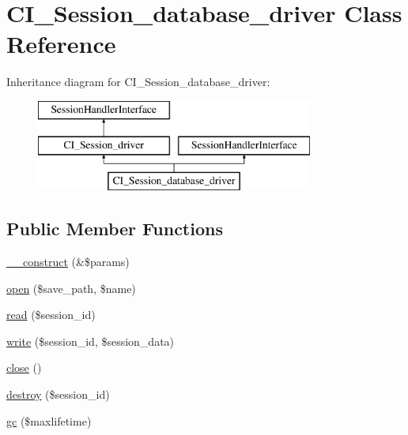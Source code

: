 \hypertarget{class_c_i___session__database__driver}{}\section{C\+I\+\_\+\+Session\+\_\+database\+\_\+driver Class Reference}
\label{class_c_i___session__database__driver}
Inheritance diagram for C\+I\+\_\+\+Session\+\_\+database\+\_\+driver\+:\begin{figure}[H]
\begin{center}
\leavevmode
\includegraphics[height=3.000000cm]{class_c_i___session__database__driver}
\end{center}
\end{figure}
\subsection*{Public Member Functions}
\begin{DoxyCompactItemize}
\item 
\mbox{\hyperlink{class_c_i___session__database__driver_ac1669c73d53d6f16cf5459a1e84d39c8}{\+\_\+\+\_\+construct}} (\&\$params)
\item 
\mbox{\hyperlink{class_c_i___session__database__driver_a614b5cf3840833913c7a73260ed28e02}{open}} (\$save\+\_\+path, \$name)
\item 
\mbox{\hyperlink{class_c_i___session__database__driver_a5bbf84ebf657be4eaccc0582377c76bf}{read}} (\$session\+\_\+id)
\item 
\mbox{\hyperlink{class_c_i___session__database__driver_ad9d124885be93668f1dbf6aace5964f5}{write}} (\$session\+\_\+id, \$session\+\_\+data)
\item 
\mbox{\hyperlink{class_c_i___session__database__driver_aa69c8bf1f1dcf4e72552efff1fe3e87e}{close}} ()
\item 
\mbox{\hyperlink{class_c_i___session__database__driver_aaec5812f6b4eb6835f88d3baa06a002a}{destroy}} (\$session\+\_\+id)
\item 
\mbox{\hyperlink{class_c_i___session__database__driver_a57aff7ee0656d8aa75d545fb8b3ae35d}{gc}} (\$maxlifetime)
\end{DoxyCompactItemize}
